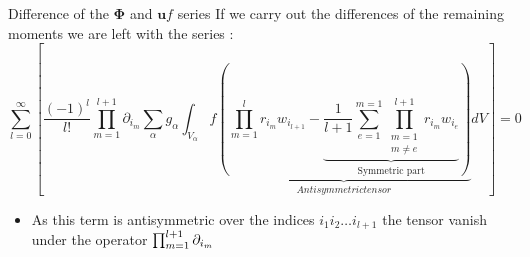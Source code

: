 \documentclass{sintefbeamer}
\begin{document}
\begin{frame}
  {Difference of the $\bm{\Phi}$ and $\textbf{u}f$ series}
If we carry out the differences of the remaining moments we are left with the series :
\begin{equation*}    
  \sum_{l=0}^\infty  
  \left[
      \frac{(-1)^l}{l!} \prod^{l+1}_{m=1}\partial_{i_m}
      \sum_\alpha  g_\alpha 
      \int_{V_\alpha} f
      \underbrace{\left(
          \prod^l_{m=1}r_{i_m} w_{i_{l+1}} 
          -
          \underbrace{\frac{1}{l+1}
          \sum_{e=1}^{m=1} 
          \prod^{l+1}_{\substack{m=1\\ m\neq e}} 
          r_{i_m} 
          w_{i_e}}_{\text{Symmetric part}}
      \right)}_{Anti symmetric tensor}
      dV
  \right] = 0
  \label{ap:eq:diff_rw_term}
\end{equation*}  
\begin{itemize}
  \item As this term is antisymmetric over the indices $i_1i_2\ldots i_{l+1}$ the tensor vanish under the operator $\prod_{m=1}^{l+1} \partial_{i_m}$
\end{itemize}
\end{frame}
\end{document}
